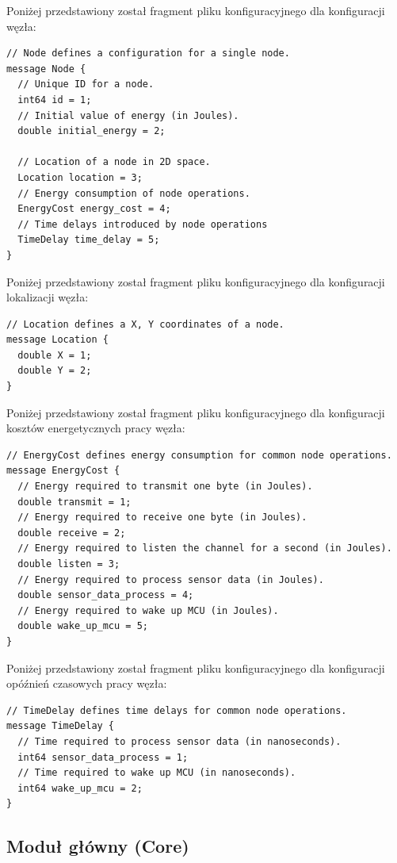 \documentclass[a4paper,12pt,twoside,openany]{report}
\begin{document}
Poniżej przedstawiony został fragment pliku konfiguracyjnego dla konfiguracji węzła:

\begin{lstlisting}
// Node defines a configuration for a single node.
message Node {
  // Unique ID for a node.
  int64 id = 1;
  // Initial value of energy (in Joules). 
  double initial_energy = 2;

  // Location of a node in 2D space.
  Location location = 3;
  // Energy consumption of node operations.
  EnergyCost energy_cost = 4;
  // Time delays introduced by node operations
  TimeDelay time_delay = 5;
}
\end{lstlisting}

Poniżej przedstawiony został fragment pliku konfiguracyjnego dla konfiguracji lokalizacji węzła:

\begin{lstlisting}
// Location defines a X, Y coordinates of a node.
message Location {
  double X = 1;
  double Y = 2;
}
\end{lstlisting}

Poniżej przedstawiony został fragment pliku konfiguracyjnego dla konfiguracji kosztów energetycznych pracy węzła:

\begin{lstlisting}
// EnergyCost defines energy consumption for common node operations.
message EnergyCost {
  // Energy required to transmit one byte (in Joules).
  double transmit = 1;
  // Energy required to receive one byte (in Joules).
  double receive = 2;
  // Energy required to listen the channel for a second (in Joules).
  double listen = 3;
  // Energy required to process sensor data (in Joules).
  double sensor_data_process = 4;
  // Energy required to wake up MCU (in Joules).
  double wake_up_mcu = 5;
}
\end{lstlisting}

Poniżej przedstawiony został fragment pliku konfiguracyjnego dla konfiguracji opóźnień czasowych pracy węzła:

\begin{lstlisting}
// TimeDelay defines time delays for common node operations.
message TimeDelay {
  // Time required to process sensor data (in nanoseconds).
  int64 sensor_data_process = 1;
  // Time required to wake up MCU (in nanoseconds).
  int64 wake_up_mcu = 2;
}
\end{lstlisting}

\subsection{Moduł główny (Core)}
\end{document}

